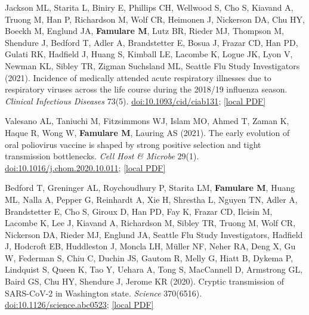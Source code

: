 \documentclass{article}
\begin{document}
\begin{llist}
\begin{items}
\item[{[19]}] Jackson ML, Starita L, Biniry E, Phillips CH, Wellwood S, Cho S, Kiavand A, Truong M, Han P, Richardson M, Wolf CR, Heimonen J, Nickerson DA, Chu HY, Boeckh M, Englund JA, \textbf{Famulare M}, Lutz BR, Rieder MJ, Thompson M, Shendure J, Bedford T, Adler A, Brandstetter E, Bosua J, Frazar CD, Han PD, Gulati RK, Hadfield J, Huang S, Kimball LE, Lacombe K, Logue JK, Lyon V, Newman KL, Sibley TR, Zigman Suchsland ML, Seattle Flu Study Investigators (2021). Incidence of medically attended acute respiratory illnesses due to respiratory viruses across the life course during the 2018/19 influenza season. \emph{Clinical Infectious Diseases} 73(5). \href{https://doi.org/10.1093/cid/ciab131}{doi:10.1093/cid/ciab131}; \href{https://famulare.github.io/assets/publication-mirror/journal-19.pdf}{[local PDF]}

\item[{[18]}] Valesano AL, Taniuchi M, Fitzsimmons WJ, Islam MO, Ahmed T, Zaman K, Haque R, Wong W, \textbf{Famulare M}, Lauring AS (2021). The early evolution of oral poliovirus vaccine is shaped by strong positive selection and tight transmission bottlenecks. \emph{Cell Host \& Microbe} 29(1). \href{https://doi.org/10.1016/j.chom.2020.10.011}{doi:10.1016/j.chom.2020.10.011}; \href{https://famulare.github.io/assets/publication-mirror/Valesano_et_al_2021_Early_evolution_of_oral_poliovirus_vaccine.pdf}{[local PDF]}

\item[{[17]}] Bedford T, Greninger AL, Roychoudhury P, Starita LM, \textbf{Famulare M}, Huang ML, Nalla A, Pepper G, Reinhardt A, Xie H, Shrestha L, Nguyen TN, Adler A, Brandstetter E, Cho S, Giroux D, Han PD, Fay K, Frazar CD, Ilcisin M, Lacombe K, Lee J, Kiavand A, Richardson M, Sibley TR, Truong M, Wolf CR, Nickerson DA, Rieder MJ, Englund JA, Seattle Flu Study Investigators, Hadfield J, Hodcroft EB, Huddleston J, Moncla LH, M\"uller NF, Neher RA, Deng X, Gu W, Federman S, Chiu C, Duchin JS, Gautom R, Melly G, Hiatt B, Dykema P, Lindquist S, Queen K, Tao Y, Uehara A, Tong S, MacCannell D, Armstrong GL, Baird GS, Chu HY, Shendure J, Jerome KR (2020). 
Cryptic transmission of SARS-CoV-2 in Washington state. \emph{Science} 370(6516). \href{https://doi.org/10.1126/science.abc0523}{doi:10.1126/science.abc0523}; \href{https://famulare.github.io/assets/publication-mirror/journal-17.pdf}{[local PDF]}


\end{items}
\end{llist}
\end{document}
